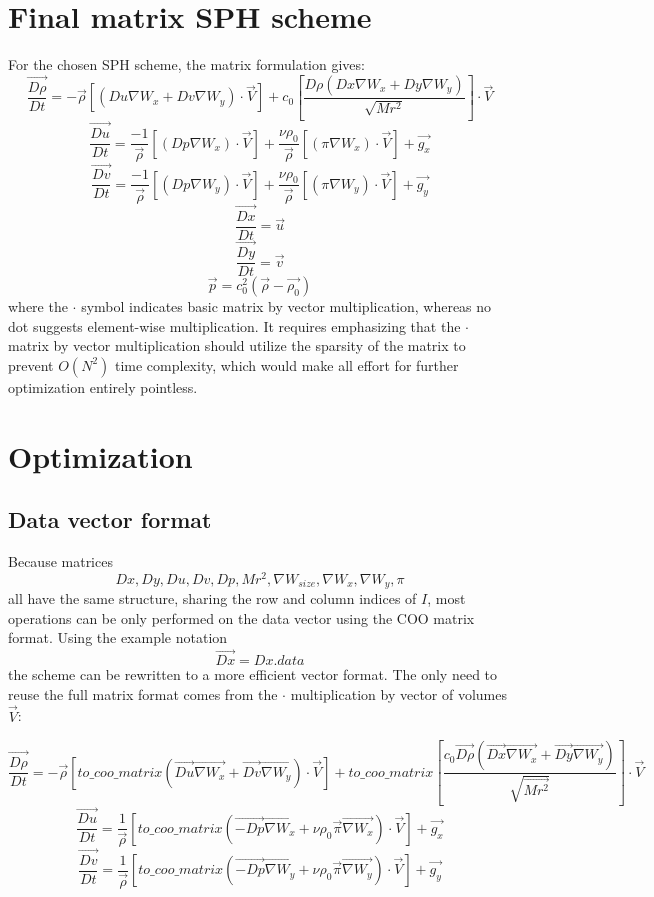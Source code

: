 \documentclass{article}
\begin{document}
\section{Final matrix SPH scheme}
For the chosen SPH scheme, the matrix formulation gives:
$$
\overrightarrow{\frac{D\rho}{Dt}}=-\Vec{\rho}\left[\left(Du\nabla W_x + Dv \nabla W_y\right)\cdot\Vec{V}\right]
+
c_0\left[\frac{D\rho\left(Dx\nabla W_x + Dy\nabla W_y \right)}{\sqrt{Mr^2}}\right]\cdot\Vec{V}
$$
$$
\overrightarrow{\frac{Du}{Dt}}=\frac{-1}{\Vec{\rho}}\left[\left(Dp\nabla W_x\right)\cdot\Vec{V}\right]+\frac{\nu\rho_0}{\Vec{\rho}}\left[\left(\pi\nabla W_x\right)\cdot\Vec{V}\right]+\Vec{g_x}
$$
$$
\overrightarrow{\frac{Dv}{Dt}}=\frac{-1}{\Vec{\rho}}\left[\left(Dp\nabla W_y\right)\cdot\Vec{V}\right]+\frac{\nu\rho_0}{\Vec{\rho}}\left[\left(\pi\nabla W_y\right)\cdot\Vec{V}\right]+\Vec{g_y}
$$
$$\overrightarrow{\frac{Dx}{Dt}}=\Vec{u}$$
$$\overrightarrow{\frac{Dy}{Dt}}=\Vec{v}$$
$$
\vec{p}=c_0^2\left(\Vec{\rho}-\Vec{\rho_0}\right)
$$
where the $\cdot$ symbol indicates basic matrix by vector multiplication, whereas no dot suggests element-wise multiplication. It requires emphasizing that the $\cdot$ matrix by vector multiplication should utilize the sparsity of the matrix to prevent $O(N^2)$ time complexity, which would make all effort for further optimization entirely pointless.
\section{Optimization}
\subsection{Data vector format}
Because matrices 
$$Dx, Dy, Du, Dv, Dp, Mr^2, \nabla W_{size}, \nabla W_x, \nabla W_y, \pi$$
all have the same structure, sharing the row and column indices of $I$, most operations can be only performed on the data vector using the COO matrix format. Using the example notation
$$\vec{Dx} = Dx.data$$
the scheme can be rewritten to a more efficient vector format. The only need to reuse the full matrix format comes from the $\cdot$ multiplication by vector of volumes $\Vec{V}$:

$$
\overrightarrow{\frac{D\rho}{Dt}}
=
-\Vec{\rho}\left[to\_coo\_matrix\left(\vec{Du}\vec{\nabla W_x} + \vec{Dv} \vec{\nabla W_y}\right)\cdot\Vec{V}\right]
+
to\_coo\_matrix\left[\frac{c_0 \Vec{D\rho}\left(\Vec{Dx}\Vec{\nabla W_x} + \Vec{Dy}\Vec{\nabla W_y} \right)}{\sqrt{\Vec{Mr^2}}}\right]\cdot\Vec{V}
$$
$$
\overrightarrow{\frac{Du}{Dt}}
=
\frac{1}{\Vec{\rho}}\left[to\_coo\_matrix\left(\vec{-Dp}\vec{\nabla W_x}+\nu\rho_0\vec{\pi}\vec{\nabla W_x}\right)\cdot\Vec{V}\right]+\Vec{g_x}
$$
$$
\overrightarrow{\frac{Dv}{Dt}}
=
\frac{1}{\Vec{\rho}}\left[to\_coo\_matrix\left(\vec{-Dp}\vec{\nabla W_y}+\nu\rho_0\vec{\pi}\vec{\nabla W_y}\right)\cdot\Vec{V}\right]+\Vec{g_y}
$$
\end{document}

